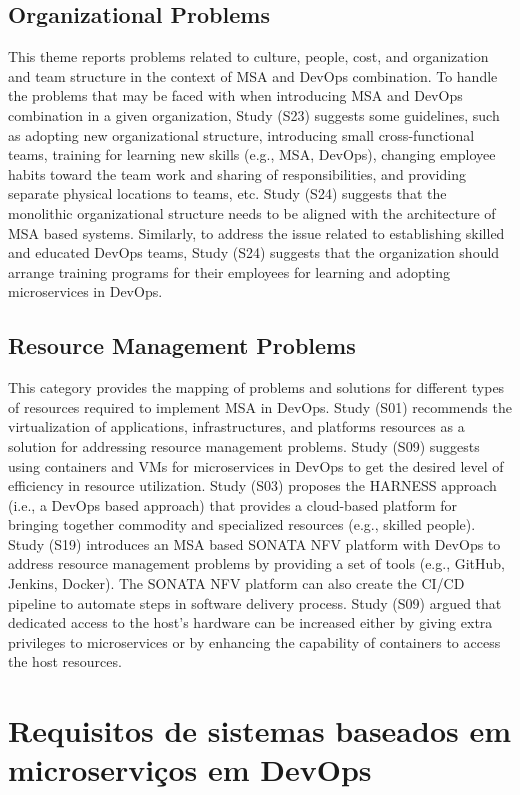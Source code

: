 \subsection{Organizational Problems}
This theme reports problems related to culture, people, cost, and organization and team structure in the context of MSA and DevOps combination. To handle the problems that may be faced with when introducing MSA and DevOps combination in a given organization, Study (S23) suggests some guidelines, such as adopting new organizational structure, introducing small cross-functional teams, training for learning new skills (e.g., MSA, DevOps), changing employee habits toward the team work and sharing of responsibilities, and providing separate physical locations to teams, etc. Study (S24) suggests that the monolithic organizational structure needs to be aligned with the architecture of MSA based systems. Similarly, to address the issue related to establishing skilled and educated DevOps teams, Study (S24) suggests that the organization should arrange training programs for their employees for learning and adopting microservices in DevOps.

\subsection{Resource Management Problems}
This category provides the mapping of problems and solutions for different types of resources required to implement MSA in DevOps. Study (S01) recommends the virtualization of applications, infrastructures, and platforms resources as a solution for addressing resource management problems. Study (S09) suggests using containers and VMs for microservices in DevOps to get the desired level of efficiency in resource utilization. Study (S03) proposes the HARNESS approach (i.e., a DevOps based approach) that provides a cloud-based platform for bringing together commodity and specialized resources (e.g., skilled people). Study (S19) introduces an MSA based SONATA NFV platform with DevOps to address resource management problems by providing a set of tools (e.g., GitHub, Jenkins, Docker). The SONATA NFV platform can also create the CI/CD pipeline to automate steps in software delivery process. Study (S09) argued that dedicated access to the host’s hardware can be increased either by giving extra privileges to microservices or by enhancing the capability of containers to access the host resources.


\section{Requisitos de sistemas baseados em microserviços em DevOps}

